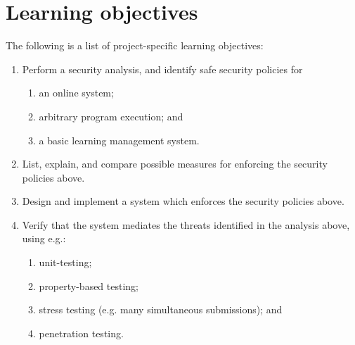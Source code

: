 
\section*{Learning objectives}

The following is a list of project-specific learning objectives:

\begin{enumerate}

\item Perform a security analysis, and identify safe security policies for

\begin{enumerate}

\item an online system;

\item arbitrary program execution; and

\item a basic learning management system.

\end{enumerate}

\item List, explain, and compare possible measures for enforcing the security
policies above.

\item Design and implement a system which enforces the security policies above.

\item Verify that the system mediates the threats identified in the analysis
above, using e.g.:

\begin{enumerate}

\item unit-testing;

\item property-based testing;

\item stress testing (e.g. many simultaneous submissions); and

\item penetration testing.

\end{enumerate}

\end{enumerate}

